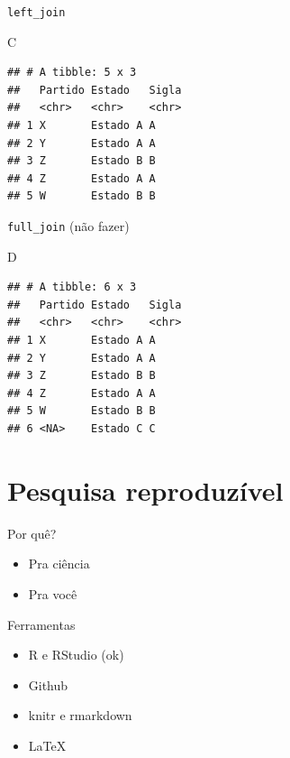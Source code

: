\documentclass[
  9pt,
  ignorenonframetext,
]{beamer}
\newenvironment{Shaded}{\begin{snugshade}}{\end{snugshade}}
\newcommand{\NormalTok}[1]{#1}
\begin{document}
\begin{frame}[fragile]{\texttt{left\_join}}
\protect\hypertarget{left_join}{}
\begin{Shaded}
\begin{Highlighting}[]
\NormalTok{C}
\end{Highlighting}
\end{Shaded}

\begin{verbatim}
## # A tibble: 5 x 3
##   Partido Estado   Sigla
##   <chr>   <chr>    <chr>
## 1 X       Estado A A    
## 2 Y       Estado A A    
## 3 Z       Estado B B    
## 4 Z       Estado A A    
## 5 W       Estado B B
\end{verbatim}
\end{frame}

\begin{frame}[fragile]{\texttt{full\_join} (não fazer)}
\protect\hypertarget{full_join-nuxe3o-fazer}{}
\begin{Shaded}
\begin{Highlighting}[]
\NormalTok{D}
\end{Highlighting}
\end{Shaded}

\begin{verbatim}
## # A tibble: 6 x 3
##   Partido Estado   Sigla
##   <chr>   <chr>    <chr>
## 1 X       Estado A A    
## 2 Y       Estado A A    
## 3 Z       Estado B B    
## 4 Z       Estado A A    
## 5 W       Estado B B    
## 6 <NA>    Estado C C
\end{verbatim}
\end{frame}

\hypertarget{pesquisa-reproduzuxedvel}{%
\section{Pesquisa reproduzível}\label{pesquisa-reproduzuxedvel}}

\begin{frame}{Por quê?}
\protect\hypertarget{por-quuxea}{}
\begin{itemize}
\item
  Pra ciência
\item
  Pra você
\end{itemize}
\end{frame}

\begin{frame}{Ferramentas}
\protect\hypertarget{ferramentas}{}
\begin{itemize}
\item
  R e RStudio (ok)
\item
  Github
\item
  knitr e rmarkdown
\item
  LaTeX
\end{itemize}
\end{frame}
\end{document}
